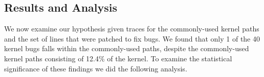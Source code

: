 \subsection{Results and Analysis}
\label{Verification-of-Hypothesis}


%
%


%
%
We now examine our hypothesis given traces for the commonly-used kernel
paths and the set of lines that were patched to fix bugs. We found that 
only 1 of the 40 kernel bugs falls within the commonly-used paths, despite 
the commonly-used kernel paths consisting of 12.4\% of the kernel.  
To examine the statistical significance of these findings we did the following 
analysis.

